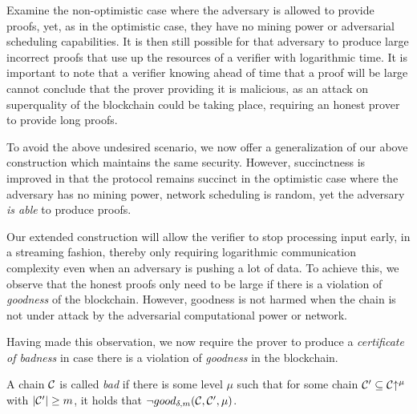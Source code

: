 Examine the non-optimistic case where the adversary is allowed to provide
proofs, yet, as in the optimistic case, they have no mining power or adversarial
scheduling capabilities. It is then still possible for that adversary to produce
large incorrect proofs that use up the resources of a verifier with logarithmic
time. It is important to note that a verifier knowing ahead of time that a proof
will be large cannot conclude that the prover providing it is malicious, as an
attack on superquality of the blockchain could be taking place, requiring an
honest prover to provide long proofs.

To avoid the above undesired scenario, we now offer a generalization of our
above construction which maintains the same security. However, succinctness is
improved in that the protocol remains succinct in the optimistic case where the
adversary has no mining power, network scheduling is random, yet the adversary
\textit{is able} to produce proofs.

Our extended construction will allow the verifier to stop processing input
early, in a streaming fashion, thereby only requiring logarithmic communication
complexity even when an adversary is pushing a lot of data. To achieve this, we
observe that the honest proofs only need to be large if there is a violation of
\textit{goodness} of the blockchain. However, goodness is not harmed when the
chain is not under attack by the adversarial computational power or network.

Having made this observation, we now require the prover to produce a
\textit{certificate of badness} in case there is a violation of
\textit{goodness} in the blockchain.

\begin{definition}[Badness]
A chain $\mathcal{C}$ is called \textit{bad} if there is some level $\mu$
such that for some chain $\mathcal{C}' \subseteq \mathcal{C}\negthickspace\uparrow^\mu$ with $|\mathcal{C}'| \geq
m$, it holds that $\lnot good_{\delta,m}(\mathcal{C}, \mathcal{C}', \mu)$.
\end{definition}

